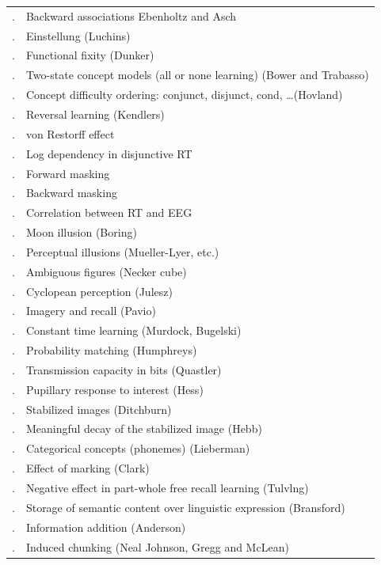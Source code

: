 \documentclass{paper}
\newcounter{magicrownumbers}[figure]
\newcommand\rownumber{\stepcounter{magicrownumbers}\arabic{magicrownumbers}.}
\begin{document}
\begin{table}
\begin{center}
\begin{tabular}{l l}
\rownumber & Backward associations Ebenholtz and Asch \\
\rownumber & Einstellung (Luchins) \\
\rownumber & Functional fixity (Dunker) \\
\rownumber & Two-state concept models (all or none learning) (Bower and Trabasso) \\
\rownumber & Concept difficulty ordering: conjunct, disjunct, cond, \ldots (Hovland) \\
\rownumber & Reversal learning (Kendlers) \\
\rownumber & von Restorff effect \\
\rownumber & Log dependency in disjunctive RT \\
\rownumber & Forward masking \\
\rownumber & Backward masking \\
\rownumber & Correlation between RT and EEG \\
\rownumber & Moon illusion (Boring) \\
\rownumber & Perceptual illusions (Mueller-Lyer, etc.) \\
\rownumber & Ambiguous figures (Necker cube) \\
\rownumber & Cyclopean perception (Julesz) \\
\rownumber & Imagery and recall (Pavio) \\
\rownumber & Constant time learning (Murdock, Bugelski) \\
\rownumber & Probability matching (Humphreys) \\
\rownumber & Transmission capacity in bits (Quastler) \\
\rownumber & Pupillary response to interest (Hess) \\
\rownumber & Stabilized images (Ditchburn) \\
\rownumber & Meaningful decay of the stabilized image (Hebb) \\
\rownumber & Categorical concepts (phonemes) (Lieberman) \\
\rownumber & Effect of marking (Clark) \\
\rownumber & Negative effect in part-whole free recall learning (Tulvlng) \\
\rownumber & Storage of semantic content over linguistic expression (Bransford) \\
\rownumber & Information addition (Anderson) \\
\rownumber & Induced chunking (Neal Johnson, Gregg and McLean) \\

\end{tabular}
\end{center}
\end{table}
\end{document}
